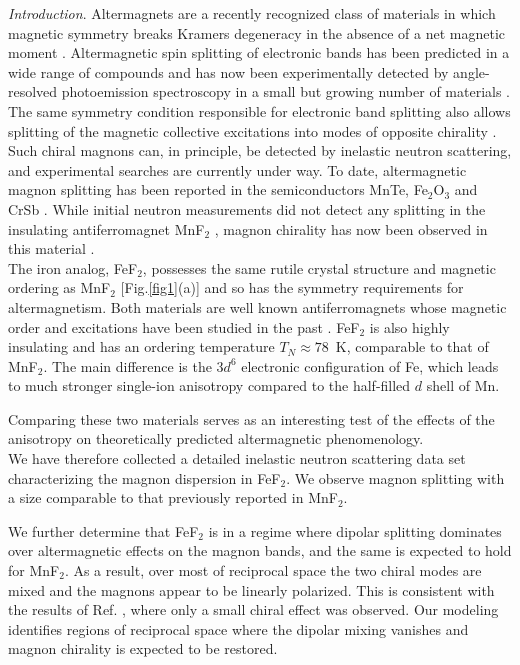 \documentclass[aps, prl, twocolumn, superscriptaddress, longbibliography]{revtex4-2}
\begin{document}
{\it Introduction}.
Altermagnets are a recently recognized class of materials in which magnetic symmetry breaks Kramers degeneracy in the absence of a net magnetic moment \cite{smej22a,smej22b}. Altermagnetic spin splitting of electronic bands has been predicted in a wide range of compounds and has now been experimentally detected by angle-resolved photoemission spectroscopy in a small but growing number of materials \cite{krempasky2024_mnte_arpes, lee2024_mnte_arpes, Reimers2024_crsb_arpes, Fedchenko2024_ruo2film_arpes}. The same symmetry condition responsible for electronic band splitting also allows splitting of the magnetic collective excitations into modes of opposite chirality \cite{Andreev_1980, smejkal2023_chiralmag,mcclarty2025_neutron}. Such chiral magnons can, in principle, be detected by inelastic neutron scattering, and experimental searches are currently under way. To date, altermagnetic magnon splitting has been reported in the semiconductors MnTe, Fe$_2$O$_3$ and CrSb \cite{liu2024_mnte_neutron,sun2025_fe2o3_neutron,singh2025_crsb_neutron}. While initial neutron measurements did not detect any splitting in the insulating antiferromagnet MnF$_2$ \cite{morano2025_mnf2}, magnon chirality has now been observed in this material \cite{faure2025_mnf2_neutron}. \\

The iron analog, FeF$_2$, possesses the same rutile crystal structure and magnetic ordering as MnF$_2$ [Fig.\ref{fig1}(a)] and so has the symmetry requirements for altermagnetism. Both materials are well known antiferromagnets whose magnetic order and excitations have been studied in the past \cite{erickson1953_mf2_diff,Hutchings1970_fef2_spinwave}. FeF$_2$ is also highly insulating and has an ordering temperature $T_{N} \approx 78 $~K, comparable to that of MnF$_2$. The main difference is the $3d^6$ electronic configuration of Fe, which leads to much stronger single-ion anisotropy compared to the half-filled $d$ shell of Mn.

Comparing these two materials serves as an interesting test of the effects of the anisotropy on theoretically predicted altermagnetic phenomenology. \\

We have therefore collected a detailed inelastic neutron scattering data set characterizing the magnon dispersion in FeF$_2$. We observe magnon splitting with a size comparable to that previously reported in MnF$_2$.

We further determine that FeF$_2$ is in a regime where dipolar splitting dominates over altermagnetic effects on the magnon bands, and the same is expected to hold for MnF$_2$. As a result, over most of reciprocal space the two chiral modes are mixed and the magnons appear to be linearly polarized. This is consistent with the results of Ref. , where only a small chiral effect was observed. Our modeling identifies regions of reciprocal space where the dipolar mixing vanishes and magnon chirality is expected to be restored. \\
\end{document}
